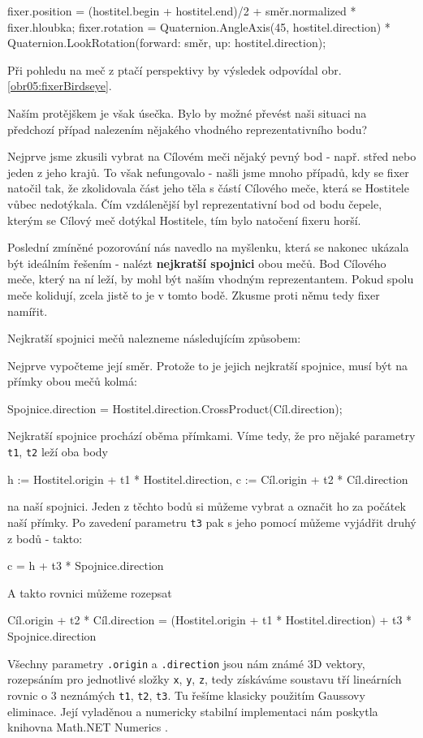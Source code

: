 \begin{code}
fixer.position = 
  (hostitel.begin + hostitel.end)/2 
  + směr.normalized * fixer.hloubka;
fixer.rotation = 
  Quaternion.AngleAxis(45, hostitel.direction)
  * Quaternion.LookRotation(forward: směr, up: hostitel.direction);
\end{code}
Při pohledu na meč z ptačí perspektivy by výsledek odpovídal obr. \ref{obr05:fixerBirdseye}. 

\bigbreak

Naším protějškem je však úsečka. Bylo by možné převést naši situaci na předchozí případ nalezením nějakého vhodného reprezentativního bodu?

Nejprve jsme zkusili vybrat na Cílovém meči nějaký pevný bod - např. střed nebo jeden z jeho krajů. To však nefungovalo - našli jsme mnoho případů, kdy se fixer natočil tak, že zkolidovala část jeho těla s částí Cílového meče, která se Hostitele vůbec nedotýkala. Čím vzdálenější byl reprezentativní bod od bodu čepele, kterým se Cílový meč dotýkal Hostitele, tím bylo natočení fixeru horší.

Poslední zmíněné pozorování nás navedlo na myšlenku, která se nakonec ukázala být ideálním řešením - nalézt \textbf{nejkratší spojnici} obou mečů. Bod Cílového meče, který na ní leží, by mohl být naším vhodným reprezentantem. Pokud spolu meče kolidují, zcela jistě to je v tomto bodě. Zkusme proti němu tedy fixer namířit. 

\bigbreak

Nejkratší spojnici mečů nalezneme následujícím způsobem:

Nejprve vypočteme její směr. Protože to je jejich nejkratší spojnice, musí být na přímky obou mečů kolmá:
\begin{code}
 Spojnice.direction = Hostitel.direction.CrossProduct(Cíl.direction);
\end{code}

Nejkratší spojnice prochází oběma přímkami. Víme tedy, že pro nějaké parametry \texttt{t1}, \texttt{t2} leží oba body
\begin{code}
 h := Hostitel.origin + t1 * Hostitel.direction,
 c := Cíl.origin + t2 * Cíl.direction
\end{code}
na naší spojnici. Jeden z těchto bodů si můžeme vybrat a označit ho za počátek naší přímky. Po zavedení parametru \texttt{t3} pak s jeho pomocí můžeme vyjádřit druhý z bodů - takto:
\begin{code}
  c = h + t3 * Spojnice.direction
\end{code}
A takto rovnici můžeme rozepsat
\begin{code}
 Cíl.origin + t2 * Cíl.direction =
 (Hostitel.origin + t1 * Hostitel.direction) + t3 * Spojnice.direction
\end{code}
Všechny parametry \texttt{.origin} a \texttt{.direction} jsou nám známé 3D vektory, rozepsáním pro jednotlivé složky \texttt{x}, \texttt{y}, \texttt{z}, tedy získáváme soustavu tří lineárních rovnic o 3 neznámých \texttt{t1}, \texttt{t2}, \texttt{t3}. Tu řešíme klasicky použitím Gaussovy eliminace. Její vyladěnou a numericky stabilní implementaci nám poskytla knihovna Math.NET Numerics \cite{MathDotNetNumerics}.

